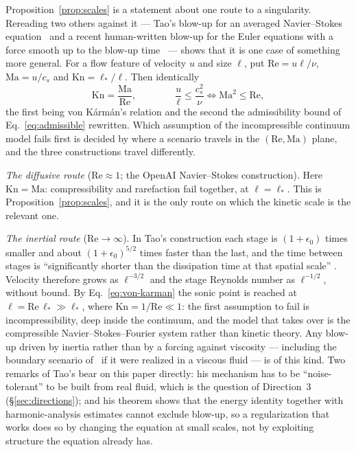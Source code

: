 \documentclass[11pt,a4paper]{article}
\begin{document}
Proposition~\ref{prop:scales} is a statement about one route to a singularity. Rereading two others
against it --- Tao's blow-up for an averaged Navier--Stokes equation~\cite{Tao2016} and a recent
human-written blow-up for the Euler equations with a force smooth up to the blow-up
time~\cite{EulerSmoothForcing2026} --- shows that it is one case of something more general. For a
flow feature of velocity $u$ and size $\ell$, put $\mathrm{Re}=u\ell/\nu$, $\mathrm{Ma}=u/c_s$ and
$\mathrm{Kn}=\ell_*/\ell$. Then identically
\begin{equation}
  \mathrm{Kn}=\frac{\mathrm{Ma}}{\mathrm{Re}},\qquad\qquad
  \frac{u}{\ell}\le\frac{c_s^2}{\nu}\iff\mathrm{Ma}^2\le\mathrm{Re},
  \label{eq:von-karman}
\end{equation}
the first being von K\'arm\'an's relation and the second the admissibility bound of
Eq.~\eqref{eq:admissible} rewritten. Which assumption of the incompressible continuum model fails
first is decided by where a scenario travels in the $(\mathrm{Re},\mathrm{Ma})$ plane, and the three
constructions travel differently.

\emph{The diffusive route} ($\mathrm{Re}\approx1$; the OpenAI Navier--Stokes construction). Here
$\mathrm{Kn}=\mathrm{Ma}$: compressibility and rarefaction fail together, at $\ell=\ell_*$. This is
Proposition~\ref{prop:scales}, and it is the only route on which the kinetic scale is the relevant
one.

\emph{The inertial route} ($\mathrm{Re}\to\infty$). In Tao's construction each stage is
$(1+\epsilon_0)$ times smaller and about $(1+\epsilon_0)^{5/2}$ times faster than the last, and the
time between stages is ``significantly shorter than the dissipation time at that spatial scale''
\cite[\S1.3]{Tao2016}. Velocity therefore grows as $\ell^{-3/2}$ and the stage Reynolds number as
$\ell^{-1/2}$, without bound. By Eq.~\eqref{eq:von-karman} the sonic point is reached at
$\ell=\mathrm{Re}\,\ell_*\gg\ell_*$, where $\mathrm{Kn}=1/\mathrm{Re}\ll1$: the first assumption to
fail is incompressibility, deep inside the continuum, and the model that takes over is the
compressible Navier--Stokes--Fourier system rather than kinetic theory. Any blow-up driven by
inertia rather than by a forcing against viscosity --- including the boundary scenario
of~\cite{HouLuo2014,ChenHou2022} if it were realized in a viscous fluid --- is of this kind. Two
remarks of Tao's bear on this paper directly: his mechanism has to be ``noise-tolerant'' to be built
from real fluid, which is the question of Direction~3 (\S\ref{sec:directions}); and his theorem shows
that the energy identity together with harmonic-analysis estimates cannot exclude blow-up, so a
regularization that works does so by changing the equation at small scales, not by exploiting
structure the equation already has.
\end{document}
